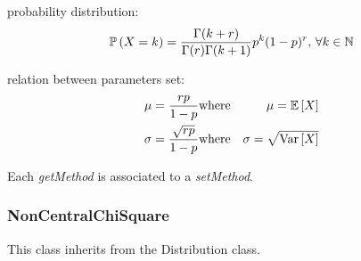 \begin{description}
\begin{description}
\end{description}

\item[Details:]  \rule{0pt}{1em}
\begin{description}
\item probability distribution:
\begin{equation}
{\mathbb P}\left( X=k \right)  = \frac{\Gamma(k + r)}{\Gamma(r)\Gamma(k+1)}p^k(1-p)^r, \, \forall k \in {\mathbb N}
\end{equation}
\item relation between parameters set:
\begin{eqnarray*}
\mu  =  \frac{rp}{1-p}               & \mbox{where}& \mu ={\mathbb E}\left[ X \right] \\
\sigma  = \frac{\sqrt{rp}}{1-p}  & \mbox{where}& \sigma =\sqrt{{\rm Var}\left[ X \right] }
\end{eqnarray*}

\end{description}
\bigskip

\item[Links:]  \rule{0pt}{1em}
\end{description}


Each  \textit{getMethod}  is associated to a \textit{setMethod}.




\newpage
\subsubsection{NonCentralChiSquare}

This class inherits from the Distribution class.

